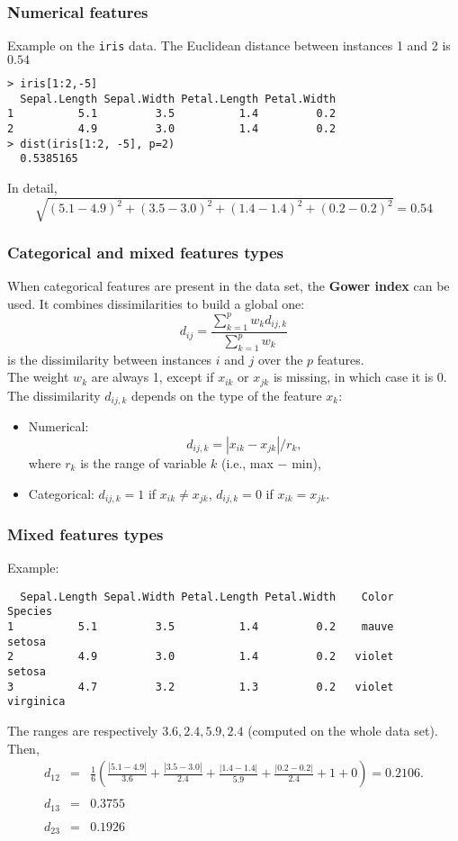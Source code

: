 \begin{frame}[fragile]
\frametitle{Numerical features}
Example on the {\tt iris} data. The Euclidean distance between instances 1 and 2 is $0.54$\\
\scriptsize
\begin{verbatim}
> iris[1:2,-5]
  Sepal.Length Sepal.Width Petal.Length Petal.Width 
1          5.1         3.5          1.4         0.2 
2          4.9         3.0          1.4         0.2 
> dist(iris[1:2, -5], p=2)
  0.5385165
\end{verbatim}
\normalsize
In detail,
$$
\sqrt{(5.1-4.9)^2+(3.5-3.0)^2+(1.4-1.4)^2+(0.2-0.2)^2}=0.54
$$
\end{frame}
\begin{frame}
\frametitle{Categorical and mixed features types}
When categorical features are present in the data set, the {\bf Gower index} can be used. It combines dissimilarities to build a global one: 
$$
d_{ij} = \frac{\sum_{k=1}^p w_k d_{ij,k}}{\sum_{k=1}^p w_k}
$$ 
is the dissimilarity between instances $i$ and $j$ over the $p$ features.\\
\vspace{0.2cm}
The weight $w_k$ are always 1, except if $x_{ik}$ or $x_{jk}$ is missing, in which case it is $0$. The dissimilarity $d_{ij,k}$ depends on the type of the feature $x_k$:
\begin{itemize}
\item Numerical: 
$$
d_{ij,k} = |x_{ik} - x_{jk}|/r_k,
$$
where $r_k$ is the range of variable $k$ (i.e., max $-$ min),
\item Categorical: $d_{ij,k} = 1$ if $x_{ik}\neq x_{jk}$, $d_{ij,k} = 0$ if $x_{ik}= x_{jk}$.
\end{itemize}
\end{frame}
\begin{frame}[fragile]
\frametitle{Mixed features types}
Example:
\scriptsize
\begin{verbatim}
  Sepal.Length Sepal.Width Petal.Length Petal.Width    Color    Species
1          5.1         3.5          1.4         0.2    mauve     setosa
2          4.9         3.0          1.4         0.2   violet     setosa
3          4.7         3.2          1.3         0.2   violet  virginica
\end{verbatim}
\normalsize
The ranges are respectively $3.6,2.4,5.9,2.4$ (computed on the whole data set). Then,
\scriptsize
\begin{eqnarray*}
d_{12} &=& \frac{1}{6}\left(\frac{|5.1-4.9|}{3.6} + \frac{|3.5-3.0|}{2.4} + \frac{|1.4-1.4|}{5.9} + \frac{|0.2-0.2|}{2.4} + 1 + 0\right) = 0.2106.\\
\\
d_{13} &=& 0.3755\\
\\
d_{23} &=& 0.1926
\end{eqnarray*}
\end{frame}
